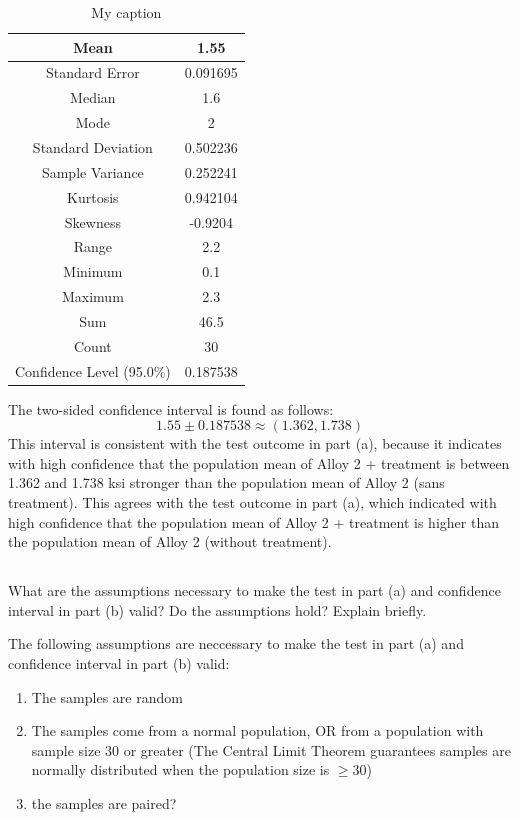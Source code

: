 \documentclass[letterpaper]{article}
\begin{document}
\begin{table}[H]
 \centering
 \begin{tabular}{|c|c|}
  \hline
  Mean                      & 1.55     \\ \hline
  Standard Error            & 0.091695 \\ \hline
  Median                    & 1.6      \\ \hline
  Mode                      & 2        \\ \hline
  Standard Deviation        & 0.502236 \\ \hline
  Sample Variance           & 0.252241 \\ \hline
  Kurtosis                  & 0.942104 \\ \hline
  Skewness                  & -0.9204  \\ \hline
  Range                     & 2.2      \\ \hline
  Minimum                   & 0.1      \\ \hline
  Maximum                   & 2.3      \\ \hline
  Sum                       & 46.5     \\ \hline
  Count                     & 30       \\ \hline
  Confidence Level (95.0\%) & 0.187538 \\ \hline
 \end{tabular}
 \caption{My caption}
 \label{my-label}
\end{table}

The two-sided confidence interval is found as follows:
$$1.55 \pm 0.187538 \approx (1.362, 1.738) $$
This interval is consistent with the test outcome in
part (a), because it indicates with high confidence that the population mean of
Alloy 2 + treatment is between 1.362 and 1.738 ksi stronger than the population
mean of Alloy 2 (sans treatment). This agrees with the test outcome in part (a),
which indicated with high confidence that the population mean of Alloy 2 +
treatment is higher than the population mean of Alloy 2 (without treatment).

\subsection{}%
What are the  assumptions necessary to make the test in part (a) and confidence
interval in part (b)  valid?  Do the assumptions hold?  Explain briefly.

The following assumptions are neccessary to make the test in part (a)
and confidence interval in part (b) valid:
\begin{enumerate}
 \item The samples are random
 \item The samples come from a normal population,
       OR from a population with sample size 30 or greater
       (The Central Limit Theorem guarantees samples are normally distributed
       when the population size is $\geq 30$)
 \item the samples are paired?
\end{enumerate}
\end{document}

